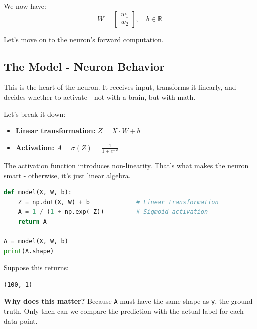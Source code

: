 \documentclass[11pt]{article}
\begin{document}
\vspace{1em}

We now have:
\[
W =
\begin{bmatrix}
w_1 \\
w_2
\end{bmatrix}, \quad
b \in \mathbb{R}
\]

Let's move on to the neuron's forward computation.


\subsection*{The Model - Neuron Behavior}

\begin{tcolorbox}[colback=gray!3, colframe=black!40, title=Step 2: Process and Activate, fonttitle=\bfseries, arc=2mm]
This is the heart of the neuron.  
It receives input, transforms it linearly, and decides whether to activate - not with a brain, but with math.
\end{tcolorbox}

\vspace{1em}

Let's break it down:

\begin{itemize}
    \item \textbf{Linear transformation:} \quad $Z = X \cdot W + b$
    \item \textbf{Activation:} \quad $A = \sigma(Z) = \frac{1}{1 + e^{-Z}}$
\end{itemize}

The activation function introduces non-linearity.  
That's what makes the neuron smart - otherwise, it's just linear algebra.

\begin{lstlisting}[language=Python]
def model(X, W, b):
    Z = np.dot(X, W) + b             # Linear transformation
    A = 1 / (1 + np.exp(-Z))         # Sigmoid activation
    return A

A = model(X, W, b)
print(A.shape)
\end{lstlisting}

\vspace{0.5em}

Suppose this returns:
\begin{lstlisting}
(100, 1)
\end{lstlisting}

\begin{tcolorbox}[colback=white!97!gray, colframe=black!15!gray, arc=1mm]
\textbf{Why does this matter?}  
Because \texttt{A} must have the same shape as \texttt{y}, the ground truth.  
Only then can we compare the prediction with the actual label for each data point.
\end{tcolorbox}
\end{document}
